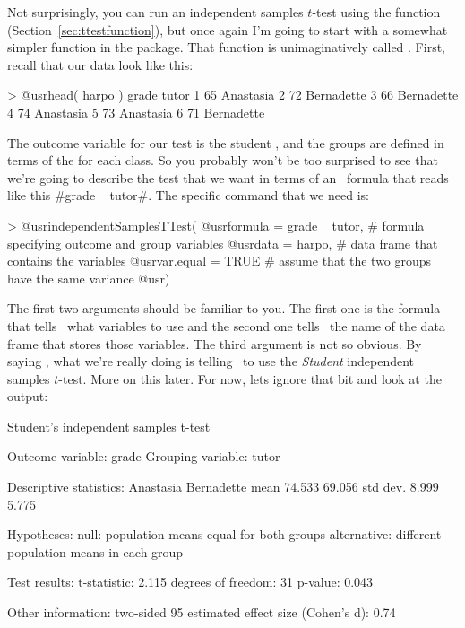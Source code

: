 Not surprisingly, you can run an independent samples $t$-test using the  function (Section~\ref{sec:ttestfunction}), but once again I'm going to start with a somewhat simpler function in the  package. That function is unimaginatively called . First, recall that our data look like this: 
\begin{rblock1}
> @usr{head( harpo )}
  grade      tutor
1    65  Anastasia
2    72 Bernadette
3    66 Bernadette
4    74  Anastasia
5    73  Anastasia
6    71 Bernadette
\end{rblock1}
The outcome variable for our test is the student , and the groups are defined in terms of the  for each class. So you probably won't be too surprised to see that we're going to describe the test that we want in terms of an \R\ formula that reads like this \rtextverb#grade ~ tutor#. The specific command that we need is:
\begin{rblock1}
> @usr{independentSamplesTTest(} 
      @usr{formula = grade ~ tutor,}  # formula specifying outcome and group variables
      @usr{data = harpo,}             # data frame that contains the variables
      @usr{var.equal = TRUE}          # assume that the two groups have the same variance
  @usr{)}
\end{rblock1}
The first two arguments should be familiar to you. The first one is the formula that tells \R\ what variables to use and the second one tells \R\ the name of the data frame that stores those variables. The third argument is not so obvious. By saying , what we're really doing is telling \R\ to use the {\it Student} independent samples $t$-test. More on this later. For now, lets ignore that bit and look at the output:
\begin{rblock1}
   Student's independent samples t-test 

Outcome variable:   grade 
Grouping variable:  tutor 

Descriptive statistics: 
            Anastasia Bernadette
   mean        74.533     69.056
   std dev.     8.999      5.775

Hypotheses: 
   null:        population means equal for both groups
   alternative: different population means in each group

Test results: 
   t-statistic:  2.115 
   degrees of freedom:  31 
   p-value:  0.043 

Other information: 
   two-sided 95%
   estimated effect size (Cohen's d):  0.74 
\end{rblock1}
